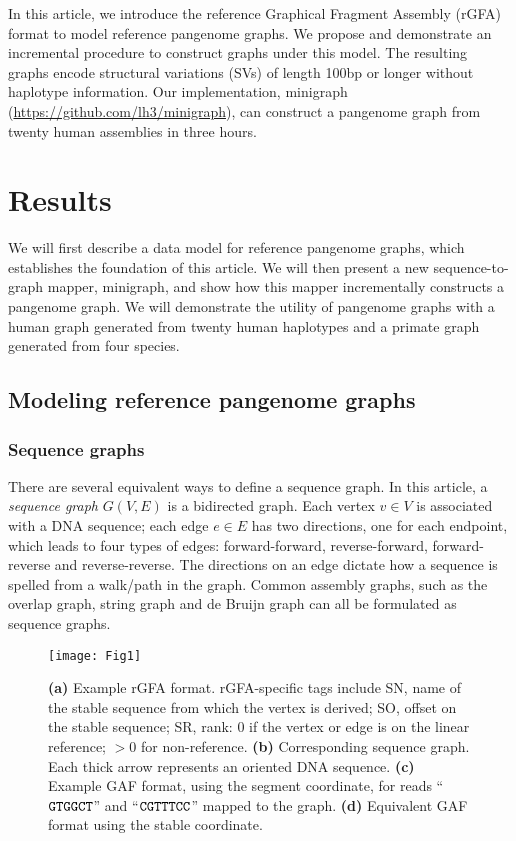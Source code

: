 \documentclass[twocolumn]{bmcart}
\begin{document}
In this article, we introduce the reference Graphical Fragment Assembly (rGFA)
format to model reference pangenome graphs. We propose and demonstrate an
incremental procedure to construct graphs under this model. The resulting
graphs encode structural variations (SVs) of length 100bp or longer without haplotype
information.  Our implementation, minigraph
(\href{https://github.com/lh3/minigraph}{https://github.com/lh3/minigraph}),
can construct a pangenome graph from twenty human assemblies in three hours.

\section*{Results}

We will first describe a data model for reference pangenome graphs, which
establishes the foundation of this article. We will then present a new
sequence-to-graph mapper, minigraph, and show how this mapper incrementally
constructs a pangenome graph. We will demonstrate the utility of pangenome
graphs with a human graph generated from twenty human haplotypes and a primate
graph generated from four species.

\subsection*{Modeling reference pangenome graphs}

\subsubsection*{Sequence graphs}

There are several equivalent ways to define a sequence graph. In this article,
a \emph{sequence graph} $G(V,E)$ is a bidirected graph. Each vertex $v\in V$ is
associated with a DNA sequence; each edge $e\in E$ has two directions, one for
each endpoint, which leads to four types of edges: forward-forward,
reverse-forward, forward-reverse and reverse-reverse. The directions on an edge
dictate how a sequence is spelled from a walk/path in the graph. Common
assembly graphs, such as the overlap graph, string graph and de Bruijn graph
can all be formulated as sequence graphs.

\begin{figure}[t]
\texttt{[image: Fig1]}
\caption{ {\bf (a)} Example rGFA
  format. rGFA-specific tags include SN, name of the stable sequence from which
  the vertex is derived; SO, offset on the stable sequence; SR, rank: 0 if the
  vertex or edge is on the linear reference; $>$0 for non-reference.  {\bf (b)}
  Corresponding sequence graph. Each thick arrow represents an oriented DNA
  sequence. {\bf (c)} Example GAF format, using the segment coordinate, for
  reads ``${\tt GTGGCT}$'' and ``${\tt CGTTTCC}$'' mapped to the graph. {\bf
  (d)} Equivalent GAF format using the stable coordinate.}\label{fig:rgfa}
\end{figure}
\end{document}
